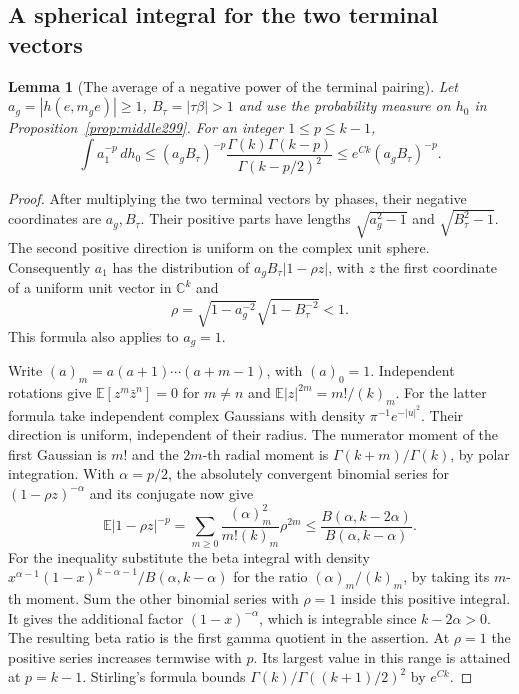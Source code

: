 \documentclass[a4paper,11pt]{article}
\newtheorem{lemma}[proposition]{Lemma}
\theoremstyle{definition}
\theoremstyle{remark}
\numberwithin{equation}{section}
\begin{document}
\subsection{A spherical integral for the two terminal vectors}\label{nav:III-63}
\begin{lemma}[The average of a negative power of the terminal pairing]\leavevmode
\label{lem:angle299}
Let \(a_g=|h(e,m_g e)|\ge1\), \(B_\tau=|\tau\beta|>1\)
and use the probability measure on \(h_0\) in
Proposition~\ref{prop:middle299}. For an integer
\(1\le p\le k-1\),
\[
 \int a_1^{-p}\,dh_0
    \le (a_gB_\tau)^{-p}
        \frac{\Gamma(k)\Gamma(k-p)}{\Gamma(k-p/2)^2}
    \le e^{Ck}(a_gB_\tau)^{-p}.
\]
\end{lemma}
\begin{proof}
After multiplying the two terminal vectors by phases, their
negative coordinates are \(a_g,B_\tau\). Their positive
parts have lengths \(\sqrt{a_g^2-1}\) and \(\sqrt{B_\tau^2-1}\).
The second positive direction is uniform on the complex
unit sphere. Consequently \(a_1\) has the distribution of
\(a_gB_\tau|1-\rho z|\), with \(z\) the first coordinate
of a uniform unit vector in \(\mathbb C^k\) and
\[
               \rho=\sqrt{1-a_g^{-2}}\sqrt{1-B_\tau^{-2}}<1.
\]
This formula also applies to \(a_g=1\).

Write \((a)_m=a(a+1)\cdots(a+m-1)\), with \((a)_0=1\).
Independent rotations give
\(\mathbb E[z^m\bar z^n]=0\) for \(m\ne n\) and
\(\mathbb E|z|^{2m}=m!/(k)_m\).
For the latter formula take independent complex Gaussians
with density \(\pi^{-1}e^{-|u|^2}\). Their direction is uniform,
independent of their radius. The numerator moment of the first
Gaussian is \(m!\) and the \(2m\)-th radial moment is
\(\Gamma(k+m)/\Gamma(k)\), by polar integration.
With \(\alpha=p/2\), the absolutely convergent binomial series
for \((1-\rho z)^{-\alpha}\) and its conjugate now give
\[
 \mathbb E|1-\rho z|^{-p}
   =\sum_{m\ge0}\frac{(\alpha)_m^2}{m!(k)_m}\rho^{2m}
   \le \frac{B(\alpha,k-2\alpha)}{B(\alpha,k-\alpha)} .
\]
For the inequality substitute the beta integral with density
\(x^{\alpha-1}(1-x)^{k-\alpha-1}/B(\alpha,k-\alpha)\)
for the ratio \((\alpha)_m/(k)_m\), by taking its \(m\)-th
moment. Sum the other binomial series with \(\rho=1\)
inside this positive integral. It gives the additional
factor \((1-x)^{-\alpha}\), which is integrable since
\(k-2\alpha>0\). The resulting beta ratio is the first
gamma quotient in the assertion. At \(\rho=1\) the
positive series increases termwise with \(p\). Its largest
value in this range is attained at \(p=k-1\).
Stirling's formula bounds
\(\Gamma(k)/\Gamma((k+1)/2)^2\) by \(e^{Ck}\).
\end{proof}
\end{document}
